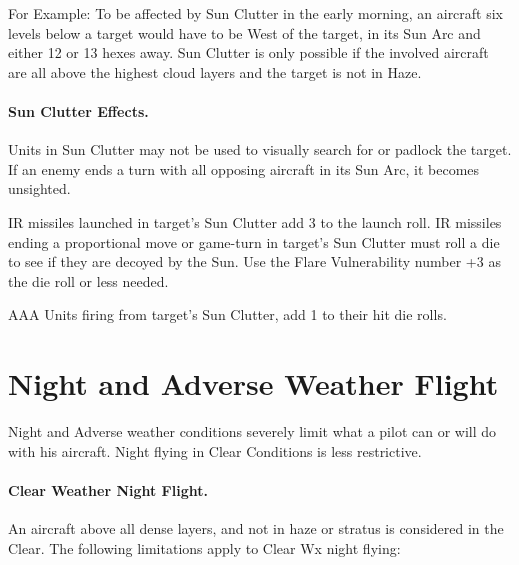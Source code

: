 \begin{advancedrules}

For Example: To be affected by Sun Clutter in the early morning, an aircraft six levels below a target would have to be West of the target, in its Sun Arc and either 12 or 13 hexes away. Sun Clutter is only possible if the involved aircraft are all above the highest cloud layers and the target is not in Haze.

\paragraph{Sun Clutter Effects.} Units in Sun Clutter may not be used to visually search for or padlock the target. If an enemy ends a turn with all opposing aircraft in its Sun Arc, it becomes unsighted.

IR missiles launched in target's Sun Clutter add 3 to the launch roll. IR missiles ending a proportional move or game-turn in target's Sun Clutter must roll a die to see if they are decoyed by the Sun. Use the Flare Vulnerability number +3 as the die roll or less needed.

AAA Units firing from target's Sun Clutter, add 1 to their hit die rolls.

\section{Night and Adverse Weather Flight}
\label{rule:night-and-adverse-weather-flight}
\label{rule:adverse-conditions}

Night and Adverse weather conditions severely limit what a pilot can or will do with his aircraft. Night flying in Clear Conditions is less restrictive.


\paragraph{Clear Weather Night Flight.} An aircraft above all dense layers, and not in haze or stratus is considered in the Clear. The following limitations apply to Clear Wx night flying:


\end{advancedrules}
